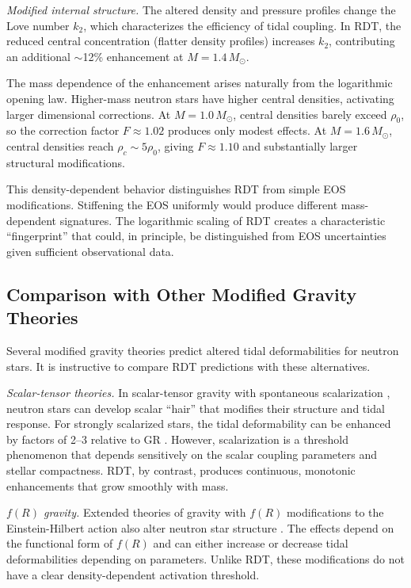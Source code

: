 \documentclass[twocolumn,showpacs,preprintnumbers,amsmath,amssymb,prd]{revtex4-2}
\begin{document}
\textit{Modified internal structure.} The altered density and pressure profiles change the Love number $k_2$, which characterizes the efficiency of tidal coupling. In RDT, the reduced central concentration (flatter density profiles) increases $k_2$, contributing an additional $\sim$12\% enhancement at $M = 1.4\,M_\odot$.

The mass dependence of the enhancement arises naturally from the logarithmic opening law. Higher-mass neutron stars have higher central densities, activating larger dimensional corrections. At $M = 1.0\,M_\odot$, central densities barely exceed $\rho_0$, so the correction factor $F \approx 1.02$ produces only modest effects. At $M = 1.6\,M_\odot$, central densities reach $\rho_c \sim 5\rho_0$, giving $F \approx 1.10$ and substantially larger structural modifications.

This density-dependent behavior distinguishes RDT from simple EOS modifications. Stiffening the EOS uniformly would produce different mass-dependent signatures. The logarithmic scaling of RDT creates a characteristic ``fingerprint'' that could, in principle, be distinguished from EOS uncertainties given sufficient observational data.

\subsection{Comparison with Other Modified Gravity Theories}
\label{sec:discussion_comparison}

Several modified gravity theories predict altered tidal deformabilities for neutron stars. It is instructive to compare RDT predictions with these alternatives.

\textit{Scalar-tensor theories.} In scalar-tensor gravity with spontaneous scalarization \cite{Damour1993,Damour1996}, neutron stars can develop scalar ``hair'' that modifies their structure and tidal response. For strongly scalarized stars, the tidal deformability can be enhanced by factors of 2--3 relative to GR \cite{Pani2014}. However, scalarization is a threshold phenomenon that depends sensitively on the scalar coupling parameters and stellar compactness. RDT, by contrast, produces continuous, monotonic enhancements that grow smoothly with mass.

\textit{$f(R)$ gravity.} Extended theories of gravity with $f(R)$ modifications to the Einstein-Hilbert action also alter neutron star structure \cite{Yazadjiev2014,Staykov2014}. The effects depend on the functional form of $f(R)$ and can either increase or decrease tidal deformabilities depending on parameters. Unlike RDT, these modifications do not have a clear density-dependent activation threshold.
\end{document}
